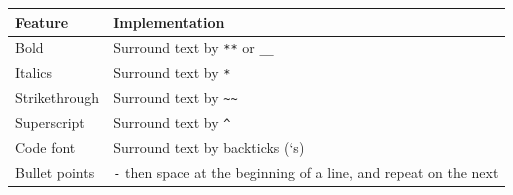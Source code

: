 \documentclass[]{article}
\begin{document}
\begin{longtable}[]{@{}ll@{}}
\toprule
\begin{minipage}[b]{0.47\columnwidth}\raggedright
Feature\strut
\end{minipage} & \begin{minipage}[b]{0.47\columnwidth}\raggedright
Implementation\strut
\end{minipage}\tabularnewline
\midrule
\endhead
\begin{minipage}[t]{0.47\columnwidth}\raggedright
Bold\strut
\end{minipage} & \begin{minipage}[t]{0.47\columnwidth}\raggedright
Surround text by \texttt{**} or \texttt{\_\_}\strut
\end{minipage}\tabularnewline
\begin{minipage}[t]{0.47\columnwidth}\raggedright
Italics\strut
\end{minipage} & \begin{minipage}[t]{0.47\columnwidth}\raggedright
Surround text by \texttt{*}\strut
\end{minipage}\tabularnewline
\begin{minipage}[t]{0.47\columnwidth}\raggedright
Strikethrough\strut
\end{minipage} & \begin{minipage}[t]{0.47\columnwidth}\raggedright
Surround text by \texttt{\textasciitilde{}\textasciitilde{}}\strut
\end{minipage}\tabularnewline
\begin{minipage}[t]{0.47\columnwidth}\raggedright
Superscript\strut
\end{minipage} & \begin{minipage}[t]{0.47\columnwidth}\raggedright
Surround text by \texttt{\^{}}\strut
\end{minipage}\tabularnewline
\begin{minipage}[t]{0.47\columnwidth}\raggedright
Code font\strut
\end{minipage} & \begin{minipage}[t]{0.47\columnwidth}\raggedright
Surround text by backticks (`s)\strut
\end{minipage}\tabularnewline
\begin{minipage}[t]{0.47\columnwidth}\raggedright
Bullet points\strut
\end{minipage} & \begin{minipage}[t]{0.47\columnwidth}\raggedright
\texttt{-} then space at the beginning of a line, and repeat on the next

\end{minipage}
\end{longtable}
\end{document}
